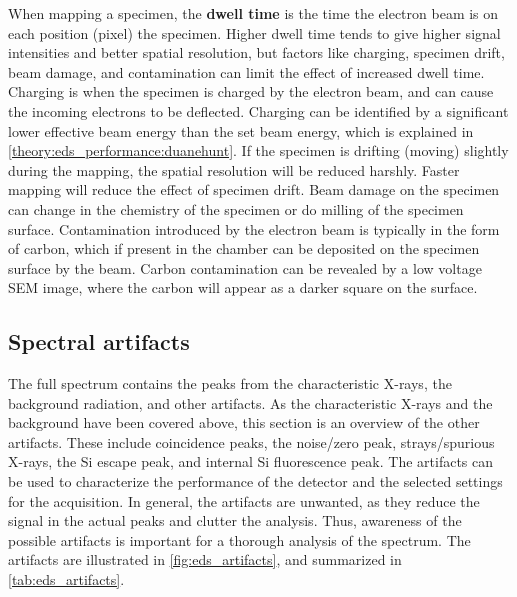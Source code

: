 When mapping a specimen, the \textbf{dwell time} is the time the electron beam is on each position (pixel) the specimen.
Higher dwell time tends to give higher signal intensities and better spatial resolution, but factors like charging, specimen drift, beam damage, and contamination can limit the effect of increased dwell time.
Charging is when the specimen is charged by the electron beam, and can cause the incoming electrons to be deflected.
Charging can be identified by a significant lower effective beam energy than the set beam energy, which is explained in \cref{theory:eds_performance:duanehunt}.
If the specimen is drifting (moving) slightly during the mapping, the spatial resolution will be reduced harshly.
Faster mapping will reduce the effect of specimen drift.
Beam damage on the specimen can change in the chemistry of the specimen or do milling of the specimen surface.
Contamination introduced by the electron beam is typically in the form of carbon, which if present in the chamber can be deposited on the specimen surface by the beam.
Carbon contamination can be revealed by a low voltage SEM image, where the carbon will appear as a darker square on the surface.






\clearpage


\subsection{Spectral artifacts}
\label{theory:eds:artifacts}



The full spectrum contains the peaks from the characteristic X-rays, the background radiation, and other artifacts.
As the characteristic X-rays and the background have been covered above, this section is an overview of the other artifacts.
These include coincidence peaks, the noise/zero peak, strays/spurious X-rays, the Si escape peak, and internal Si fluorescence peak.
The artifacts can be used to characterize the performance of the detector and the selected settings for the acquisition.
In general, the artifacts are unwanted, as they reduce the signal in the actual peaks and clutter the analysis.
Thus, awareness of the possible artifacts is important for a thorough analysis of the spectrum.
The artifacts are illustrated in \cref{fig:eds_artifacts}, and summarized in \cref{tab:eds_artifacts}.


